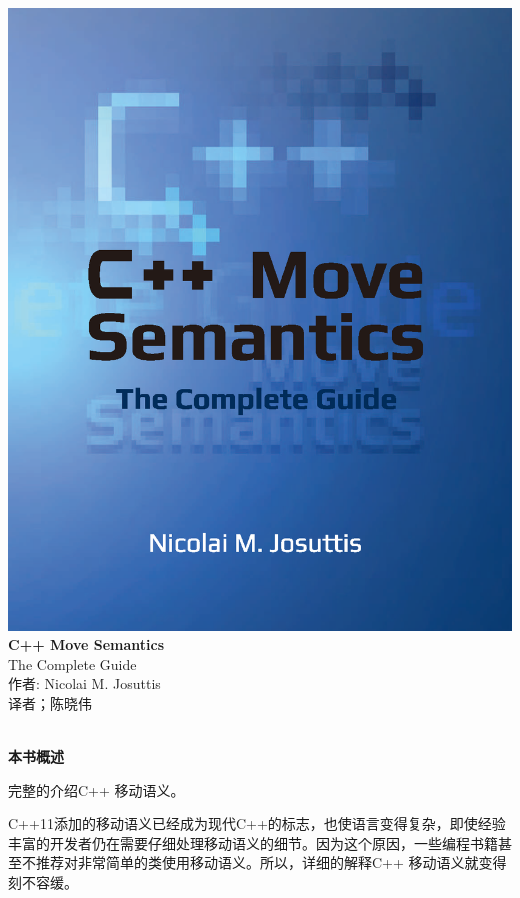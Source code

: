 \documentclass[11pt,a4paper,UTF8]{ctexart}
\begin{document}
	
	\begin{center}
		\includegraphics[width=1.\textwidth]{cover}
		\newpage
		\huge
		\textbf{C++ Move Semantics} 
		\\[9pt]
		\normalsize
		The Complete Guide
		\\[10pt]
		\normalsize 
		作者: Nicolai M. Josuttis
		\\[8pt]
		\normalsize
		译者；陈晓伟
	\end{center}
	
	\hspace*{\fill} \\ %
	\noindent\textbf{本书概述}\ \par

	完整的介绍C++ 移动语义。\par
	
	C++11添加的移动语义已经成为现代C++的标志，也使语言变得复杂，即使经验丰富的开发者仍在需要仔细处理移动语义的细节。因为这个原因，一些编程书籍甚至不推荐对非常简单的类使用移动语义。所以，详细的解释C++ 移动语义就变得刻不容缓。\par
	
\end{document}
